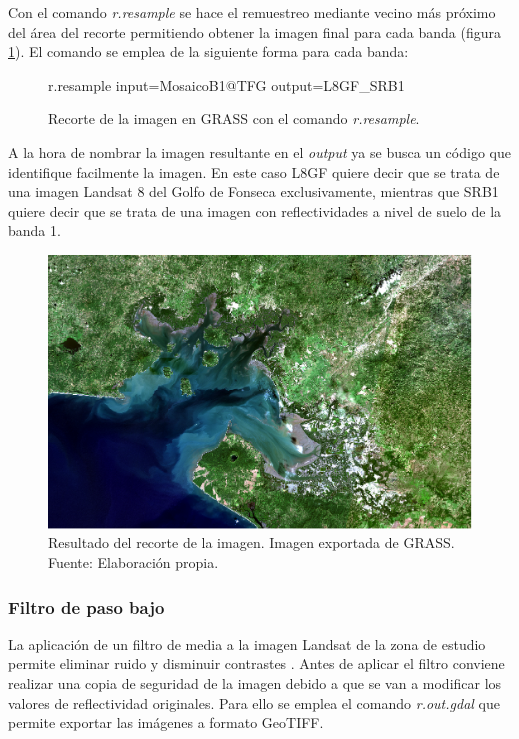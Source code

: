 Con el comando \textit{r.resample} se hace el remuestreo mediante vecino más próximo del área del recorte permitiendo obtener la imagen final para cada banda (figura \ref{fig:recorte}). El comando se emplea de la siguiente forma para cada banda:

\begin{figure}[h]
\centering
\begin{boxedverbatim}
	r.resample input=MosaicoB1@TFG output=L8GF_SRB1
\end{boxedverbatim}
\caption[Recorte de la imagen]{Recorte de la imagen en GRASS con el comando \textit{r.resample}.}
\end{figure}

A la hora de nombrar la imagen resultante en el \textit{output} ya se busca un código que identifique facilmente la imagen. En este caso L8GF quiere decir que se trata de una imagen Landsat 8 del Golfo de Fonseca exclusivamente, mientras que SRB1 quiere decir que se trata de una imagen con reflectividades a nivel de suelo de la banda 1.

\begin{figure}
	\centering
	\includegraphics[width=0.8\linewidth]{./Imagenes/Recorte.eps}
	\caption[Recorte de imagen Landsat]{Resultado del recorte de la imagen. Imagen exportada de GRASS. Fuente: Elaboración propia.}
	\label{fig:recorte}
\end{figure}

\subsubsection{Filtro de paso bajo}
La aplicación de un filtro de media a la imagen Landsat de la zona de estudio permite eliminar ruido y disminuir contrastes \citep{aldalur2002}. Antes de aplicar el filtro conviene realizar una copia de seguridad de la imagen debido a que se van a modificar los valores de reflectividad originales. Para ello se emplea el comando \textit{r.out.gdal} que permite exportar las imágenes a formato GeoTIFF.\Sep

